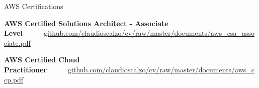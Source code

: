 



\begin{cventries}

	\cvproj
        {AWS Certifications}
        {}
        {}
        {}
        {
            \begin{cvitems}
                \item \textbf{AWS Certified Solutions Architect - Associate Level}~~~\textbullet~~~\href{https://github.com/claudioscalzo/cv/raw/master/documents/aws\_csa\_associate.pdf}{github.com/claudioscalzo/cv/raw/master/documents/aws\_csa\_associate.pdf}
                \item \textbf{AWS Certified Cloud Practitioner}~~~\textbullet~~~\href{https://github.com/claudioscalzo/cv/raw/master/documents/aws\_ccp.pdf}{github.com/claudioscalzo/cv/raw/master/documents/aws\_ccp.pdf}
            \end{cvitems}
        }
\end{cventries}
